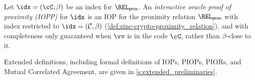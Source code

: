 \begin{definition}
\label{def:zinc-crypto-iopp}
Let $\idx=(\cC, \beta)$ be an index for $\REL_{\mathsf{prox}}$. 
An \emph{interactive oracle proof of proximity (IOPP)} for $\idx$ is an IOP for the proximity relation $\REL_{\mathsf{prox}}$ with  index restricted to $\idx = (\mathcal{C},\beta)$ (\cref{def:zinc-crypto-proximity_relation}), and with completeness only guaranteed when $\vv$ is in the code $\cC$, rather than $\beta$-close to it.

\end{definition}




Extended definitions, including formal definitions of IOPs, PIOPs, PIORs, and Mutual Correlated Agreement, are given in \cref{s:extended_preliminaries}.
